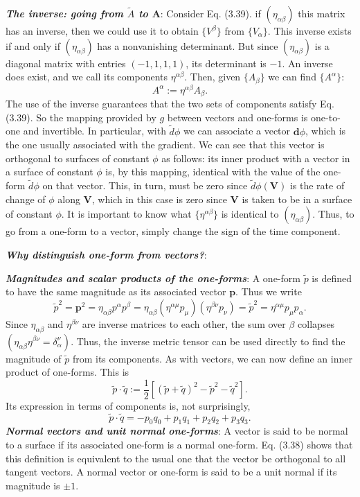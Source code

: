 \documentclass[12pt]{book}
\begin{document}
    \textit{\textbf{The inverse: going from $\tilde{A}$ to $\mathbf{A}$}}: Consider Eq. (3.39). if \((\eta_{\alpha\beta})\) this matrix has an inverse, then we could use it to obtain \(\{V^\beta\}\) from \(\{V_\alpha\}\). This inverse exists if and only if \((\eta_{\alpha\beta})\) has a nonvanishing determinant. But since \((\eta_{\alpha\beta})\) is a diagonal matrix with entries \((-1, 1, 1, 1)\), its determinant is \(-1\). An inverse does exist, and we call its components \(\eta^{\alpha\beta}\). Then, given \(\{A_\beta\}\) we can find \(\{A^\alpha\}\):
    \[
    A^\alpha := \eta^{\alpha\beta}A_\beta. \tag{3.43}
    \]
    The use of the inverse guarantees that the two sets of components satisfy Eq. (3.39). So the mapping provided by \(g\) between vectors and one-forms is one-to-one and invertible. 
    In particular, with \(\tilde{d}\phi\) we can associate a vector \(\mathbf{d}\phi\), which is the one usually associated with the gradient. We can see that this vector is orthogonal to surfaces of constant \(\phi\) as follows: its inner product with a vector in a surface of constant \(\phi\) is, by this mapping, identical with the value of the one-form \(\tilde{d}\phi\) on that vector. This, in turn, must be zero since \(\tilde{d}\phi(\mathbf{V})\) is the rate of change of \(\phi\) along \(\mathbf{V}\), which in this case is zero since \(\mathbf{V}\) is taken to be in a surface of constant \(\phi\).
    It is important to know what \(\{\eta^{\alpha\beta}\}\) is identical to \((\eta_{\alpha\beta})\). Thus, to go from a one-form to a vector, simply change the sign of the time component.
    
    \textit{\textbf{Why distinguish one-form from vectors?}}: 
    
    \textit{\textbf{Magnitudes and scalar products of the one-forms}}: 
    A one-form \(\tilde{p}\) is defined to have the same magnitude as its associated vector \(\mathbf{p}\). Thus we write
    \[
    \tilde{p}^2 = \mathbf{p}^2 = \eta_{\alpha\beta} p^\alpha p^\beta = \eta_{\alpha\beta} (\eta^{\alpha\mu} p_\mu)(\eta^{\beta\nu} p_\nu) = \tilde{p}^2 = \eta^{\alpha\mu} p_\mu p_\alpha. \tag{3.50}
    \]
    Since \(\eta_{\alpha\beta}\) and \(\eta^{\beta\nu}\) are inverse matrices to each other, the sum over \(\beta\) collapses \((\eta_{\alpha\beta}\eta^{\beta\nu} = \delta^\nu_\alpha)\). Thus, the inverse metric tensor can be used directly to find the magnitude of \(\tilde{p}\) from its components.
    As with vectors, we can now define an inner product of one-forms. This is
    \[
    \tilde{p} \cdot \tilde{q} := \frac{1}{2} \left[ (\tilde{p} + \tilde{q})^2 - \tilde{p}^2 - \tilde{q}^2 \right]. \tag{3.52}
    \]
    Its expression in terms of components is, not surprisingly,
    \[
    \tilde{p} \cdot \tilde{q} = -p_0 q_0 + p_1 q_1 + p_2 q_2 + p_3 q_3. \tag{3.53}
    \]
    \textit{\textbf{Normal vectors and unit normal one-forms}}:
    A vector is said to be normal to a surface if its associated one-form is a normal one-form. Eq. (3.38) shows that this definition is equivalent to the usual one that the vector be orthogonal to all tangent vectors. A normal vector or one-form is said to be a unit normal if its magnitude is \(\pm 1\).
\end{document}

